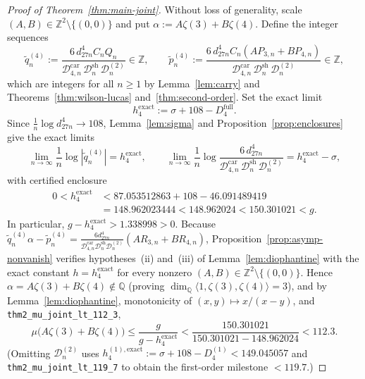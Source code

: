 \documentclass[11pt,reqno]{amsart}
\theoremstyle{definition}
\theoremstyle{remark}
\newcommand{\QQ}{\mathbb{Q}}
\newcommand{\ZZ}{\mathbb{Z}}
\begin{document}
\begin{proof}[Proof of Theorem~\ref{thm:main-joint}]
Without loss of generality, scale $(A, B) \in \ZZ^2 \setminus \{(0, 0)\}$ and put $\alpha := A\zeta(3) + B\zeta(4)$. Define the integer sequences
\[
  \widetilde{q}_n^{(4)} := \frac{6\, d_{27n}^4 C_n Q_n}{\mathcal{D}_{4,n}^{\mathrm{car}}\,\mathcal{D}_n^{\mathrm{sh}}\,\mathcal{D}_n^{(2)}} \in \ZZ,
  \qquad
  \widetilde{p}_n^{(4)} := \frac{6\, d_{27n}^4 C_n (A P_{3,n} + B P_{4,n})}{\mathcal{D}_{4,n}^{\mathrm{car}}\,\mathcal{D}_n^{\mathrm{sh}}\,\mathcal{D}_n^{(2)}} \in \ZZ,
\]
which are integers for all $n \ge 1$ by Lemma~\ref{lem:carry} and Theorems~\ref{thm:wilson-lucas} and~\ref{thm:second-order}. Set the exact limit
\[
  h_4^{\mathrm{exact}} := \sigma + 108 - D_4^{\mathrm{full}}.
\]
Since $\frac{1}{n}\log d_{27n}^4 \to 108$, Lemma~\ref{lem:sigma} and Proposition~\ref{prop:enclosures} give the exact limits
\[
  \lim_{n\to\infty} \frac{1}{n}\log|\widetilde{q}_n^{(4)}| = h_4^{\mathrm{exact}},
  \qquad
  \lim_{n\to\infty} \frac{1}{n}\log\frac{6\,d_{27n}^4}{\mathcal{D}_{4,n}^{\mathrm{car}}\,\mathcal{D}_n^{\mathrm{sh}}\,\mathcal{D}_n^{(2)}} = h_4^{\mathrm{exact}} - \sigma,
\]
with certified enclosure
\begin{align*}
  0 < h_4^{\mathrm{exact}}
  &< 87.053512863 + 108 - 46.091489419 \\
  &= 148.962023444 < 148.962024 < 150.301021 < g.
\end{align*}
In particular, $g - h_4^{\mathrm{exact}} > 1.338998 > 0$. Because $\widetilde{q}_n^{(4)}\alpha - \widetilde{p}_n^{(4)} = \frac{6 d_{27n}^4}{\mathcal{D}_{4,n}^{\mathrm{car}}\mathcal{D}_n^{\mathrm{sh}}\mathcal{D}_n^{(2)}}(A R_{3,n} + B R_{4,n})$, Proposition~\ref{prop:asymp-nonvanish} verifies hypotheses~(ii) and~(iii) of Lemma~\ref{lem:diophantine} with the exact constant $h = h_4^{\mathrm{exact}}$ for every nonzero $(A, B) \in \ZZ^2 \setminus \{(0, 0)\}$. Hence $\alpha = A\zeta(3) + B\zeta(4) \notin \QQ$ (proving $\dim_{\QQ}\langle 1, \zeta(3), \zeta(4)\rangle = 3$), and by Lemma~\ref{lem:diophantine}, monotonicity of $(x,y) \mapsto x/(x-y)$, and \texttt{thm2\_mu\_\allowbreak joint\_lt\_112\_3},
\[
  \mu\bigl(A\zeta(3) + B\zeta(4)\bigr)
  \le \frac{g}{g - h_4^{\mathrm{exact}}}
  < \frac{150.301021}{150.301021 - 148.962024}
  < 112.3.
\]
(Omitting $\mathcal{D}_n^{(2)}$ uses $h_4^{(1),\mathrm{exact}} := \sigma + 108 - D_4^{(1)} < 149.045057$ and \texttt{thm2\_mu\_\allowbreak joint\_lt\_119\_7} to obtain the first-order milestone $< 119.7$.)
\end{proof}
\end{document}
